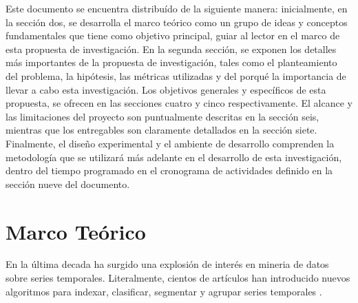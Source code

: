 Este documento se encuentra distribu\'ido de la siguiente manera: inicialmente, en la secci\'on dos, se desarrolla el marco te\'orico como un grupo de ideas y conceptos fundamentales que tiene como objetivo principal, guiar al lector en el marco de esta propuesta de investigaci\'on. En la segunda secci\'on, se exponen los detalles m\'as importantes de la propuesta de investigaci\'on, tales como el planteamiento del problema, la hip\'otesis, las m\'etricas utilizadas y del porqu\'e la importancia de llevar a cabo esta investigaci\'on. Los objetivos generales y espec\'ificos de esta propuesta, se ofrecen en las secciones cuatro y cinco respectivamente. El alcance y las limitaciones del proyecto son puntualmente descritas en la secci\'on seis, mientras que los entregables son claramente detallados en la secci\'on siete. Finalmente, el dise\~no experimental y el ambiente de desarrollo comprenden la metodolog\'ia que se utilizar\'a m\'as adelante en el desarrollo de esta investigaci\'on, dentro del tiempo programado en el cronograma de actividades definido en la secci\'on nueve del documento.
\section{\textbf{Marco Te\'orico}}
En la \'ultima decada ha surgido una explosi\'on de inter\'es en mineria de datos sobre series temporales. Literalmente, cientos de art\'iculos han introducido nuevos algoritmos para indexar, clasificar, segmentar y agrupar series temporales \cite{sigmod}. 
